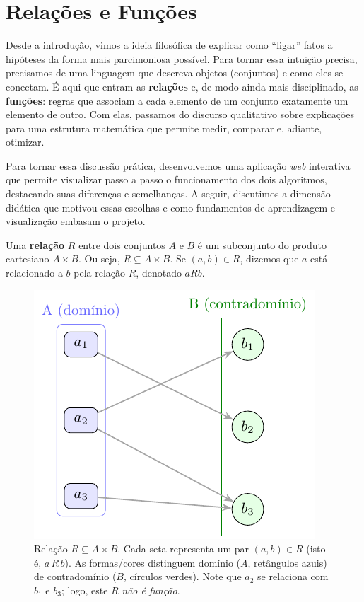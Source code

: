 \section{Relações e Funções}


Desde a introdução, vimos a ideia filosófica de explicar como “ligar” fatos a hipóteses da forma mais parcimoniosa possível. Para tornar essa intuição precisa, precisamos de uma linguagem que descreva objetos (conjuntos) e como eles se conectam. É aqui que entram as \textbf{relações} e, de modo ainda mais disciplinado, as \textbf{funções}: regras que associam a cada elemento de um conjunto exatamente um elemento de outro. Com elas, passamos do discurso qualitativo sobre explicações para uma estrutura matemática que permite medir, comparar e, adiante, otimizar.


Para tornar essa discussão prática, desenvolvemos uma aplicação \textit{web} interativa que permite visualizar passo a passo o funcionamento dos dois algoritmos, destacando suas diferenças e semelhanças. A seguir, discutimos a dimensão didática que motivou essas escolhas e como fundamentos de aprendizagem e visualização embasam o projeto.


Uma \textbf{relação} \(R\) entre dois conjuntos \(A\) e \(B\) é um subconjunto do produto cartesiano \(A \times B\). Ou seja, \(R \subseteq A \times B\). Se \((a,b) \in R\), dizemos que \(a\) está relacionado a \(b\) pela relação \(R\), denotado \(aRb\).


\begin{figure}[H]
	\centering
	\includegraphics[width=0.9\linewidth]{figures/fig_relacao.pdf}

	\caption{Relação $R\subseteq A\times B$. Cada seta representa um par $(a,b)\in R$ (isto é, $a\,R\,b$). As formas/cores distinguem domínio ($A$, retângulos azuis) de contradomínio ($B$, círculos verdes). Note que $a_2$ se relaciona com $b_1$ e $b_3$; logo, este $R$ \emph{não é função}.}
	\label{fig:relacao}
\end{figure}



